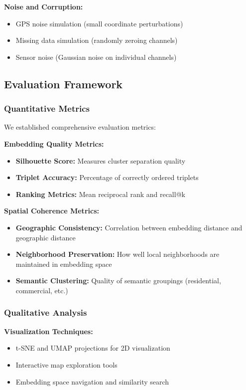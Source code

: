 \textbf{Noise and Corruption:}
\begin{itemize}
    \item GPS noise simulation (small coordinate perturbations)
    \item Missing data simulation (randomly zeroing channels)
    \item Sensor noise (Gaussian noise on individual channels)
\end{itemize}

\subsection{Evaluation Framework}

\subsubsection{Quantitative Metrics}

We established comprehensive evaluation metrics:

\textbf{Embedding Quality Metrics:}
\begin{itemize}
    \item \textbf{Silhouette Score:} Measures cluster separation quality
    \item \textbf{Triplet Accuracy:} Percentage of correctly ordered triplets
    \item \textbf{Ranking Metrics:} Mean reciprocal rank and recall@k
\end{itemize}

\textbf{Spatial Coherence Metrics:}
\begin{itemize}
    \item \textbf{Geographic Consistency:} Correlation between embedding distance and geographic distance
    \item \textbf{Neighborhood Preservation:} How well local neighborhoods are maintained in embedding space
    \item \textbf{Semantic Clustering:} Quality of semantic groupings (residential, commercial, etc.)
\end{itemize}

\subsubsection{Qualitative Analysis}

\textbf{Visualization Techniques:}
\begin{itemize}
    \item t-SNE and UMAP projections for 2D visualization
    \item Interactive map exploration tools
    \item Embedding space navigation and similarity search
\end{itemize}

